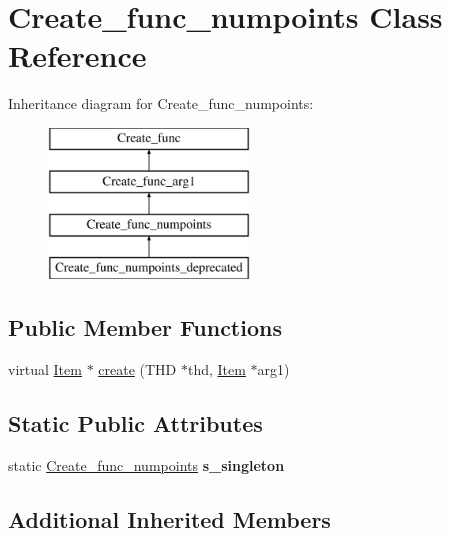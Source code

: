 \hypertarget{classCreate__func__numpoints}{}\section{Create\+\_\+func\+\_\+numpoints Class Reference}
\label{classCreate__func__numpoints}
Inheritance diagram for Create\+\_\+func\+\_\+numpoints\+:\begin{figure}[H]
\begin{center}
\leavevmode
\includegraphics[height=4.000000cm]{classCreate__func__numpoints}
\end{center}
\end{figure}
\subsection*{Public Member Functions}
\begin{DoxyCompactItemize}
\item 
virtual \mbox{\hyperlink{classItem}{Item}} $\ast$ \mbox{\hyperlink{classCreate__func__numpoints_a11173c776240d156218d2605cc51379d}{create}} (T\+HD $\ast$thd, \mbox{\hyperlink{classItem}{Item}} $\ast$arg1)
\end{DoxyCompactItemize}
\subsection*{Static Public Attributes}
\begin{DoxyCompactItemize}
\item 
\mbox{\label{classCreate__func__numpoints_af7eea7668f7dcc7d7e7c24fd38fcdd00}} 
static \mbox{\hyperlink{classCreate__func__numpoints}{Create\+\_\+func\+\_\+numpoints}} {\bfseries s\+\_\+singleton}
\end{DoxyCompactItemize}
\subsection*{Additional Inherited Members}


